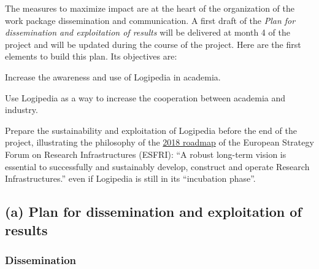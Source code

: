The measures to maximize impact are at the heart of the organization
of the work package dissemination and communication.
A first draft of the {\em Plan for dissemination and exploitation of
  results} will be delivered at month 4 of the project and will
be updated during the course of the project.
Here are the first elements to build this plan.
Its objectives are:
\begin{compactitem}
\item Increase the awareness and use of Logipedia in academia.
\item Use Logipedia as a way to increase the cooperation between academia and
industry. 
\item Prepare the sustainability and exploitation of Logipedia before the
  end of the project, illustrating the philosophy of 
the 
\href{http://roadmap2018.esfri.eu/media/1048/rm2018-part1-20.pdf}{2018
  roadmap} of the European Strategy Forum on Research Infrastructures
(ESFRI): 
``A robust long-term vision is essential to successfully and
sustainably develop, construct and operate Research Infrastructures.''
even if Logipedia is still in its ``incubation phase''.
\end{compactitem}



\subsection*{(a) Plan for dissemination and exploitation of results}
\label{sec:dissemination}


\subsubsection*{Dissemination}

